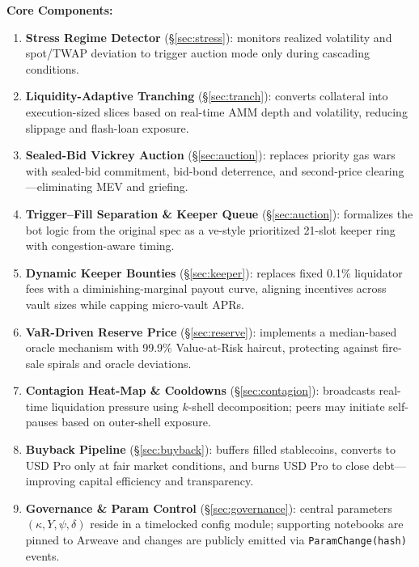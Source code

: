 \documentclass[11pt]{article}
\newcommand{\secref}[1]{\hyperref[#1]{\S\ref*{#1}}}
\begin{document}
\vspace{1em}
\noindent
\textbf{Core Components:}
\begin{enumerate}[label=\textbf{\arabic*.},wide, labelindent=0pt]
  \item \textbf{Stress Regime Detector} (\secref{sec:stress}): monitors realized volatility and spot/TWAP deviation to trigger auction mode only during cascading conditions.

  \item \textbf{Liquidity-Adaptive Tranching} (\secref{sec:tranch}): converts collateral into execution-sized slices based on real-time AMM depth and volatility, reducing slippage and flash-loan exposure.

  \item \textbf{Sealed-Bid Vickrey Auction} (\secref{sec:auction}): replaces priority gas wars with sealed-bid commitment, bid-bond deterrence, and second-price clearing—eliminating MEV and griefing.

  \item \textbf{Trigger–Fill Separation \& Keeper Queue} (\secref{sec:auction}): formalizes the bot logic from the original spec as a ve-style prioritized 21-slot keeper ring with congestion-aware timing.

  \item \textbf{Dynamic Keeper Bounties} (\secref{sec:keeper}): replaces fixed 0.1\% liquidator fees with a diminishing-marginal payout curve, aligning incentives across vault sizes while capping micro-vault APRs.

  \item \textbf{VaR-Driven Reserve Price} (\secref{sec:reserve}): implements a median-based oracle mechanism with 99.9\% Value-at-Risk haircut, protecting against fire-sale spirals and oracle deviations.

  \item \textbf{Contagion Heat-Map \& Cooldowns} (\secref{sec:contagion}): broadcasts real-time liquidation pressure using $k$-shell decomposition; peers may initiate self-pauses based on outer-shell exposure.

  \item \textbf{Buyback Pipeline} (\secref{sec:buyback}): buffers filled stablecoins, converts to USD Pro only at fair market conditions, and burns USD Pro to close debt—improving capital efficiency and transparency.

  \item \textbf{Governance \& Param Control} (\secref{sec:governance}): central parameters \((\kappa, Y, \psi, \delta)\) reside in a timelocked config module; supporting notebooks are pinned to Arweave and changes are publicly emitted via \texttt{ParamChange(hash)} events.
\end{enumerate}
\end{document}
